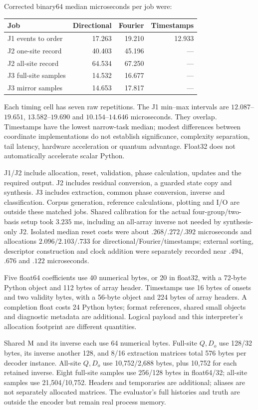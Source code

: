Corrected binary64 median microseconds per job were:
\begin{center}
\begin{tabular}{lrrr}\toprule
Job & Directional & Fourier & Timestamps\\\midrule
J1 events to order &17.263&19.210&12.933\\
J2 one-site record&40.403&45.196&---\\
J2 all-site record&64.534&67.250&---\\
J3 full-site samples&14.532&16.677&---\\
J3 mirror samples&14.653&17.817&---\\\bottomrule
\end{tabular}
\end{center}
Each timing cell has seven raw repetitions. The J1 min--max intervals are $12.087$--$19.651$, $13.582$--$19.690$ and $10.154$--$14.646$ microseconds. They overlap. Timestamps have the lowest narrow-task median; modest differences between coordinate implementations do not establish significance, complexity separation, tail latency, hardware acceleration or quantum advantage. Float32 does not automatically accelerate scalar Python.

J1/J2 include allocation, reset, validation, phase calculation, updates and the required output. J2 includes residual conversion, a guarded state copy and synthesis. J3 includes extraction, common phase conversion, inverse and classification. Corpus generation, reference calculations, plotting and I/O are outside these matched jobs. Shared calibration for the actual four-group/two-basis setup took $3.235$ ms, including an all-array inverse not needed by synthesis-only J2. Isolated median reset costs were about $.268/.272/.392$ microseconds and allocations $2.096/2.103/.733$ for directional/Fourier/timestamps; external sorting, descriptor construction and clock addition were separately recorded near $.494$, $.676$ and $.122$ microseconds.

Five float64 coefficients use 40 numerical bytes, or 20 in float32, with a 72-byte Python object and 112 bytes of array header. Timestamps use 16 bytes of onsets and two validity bytes, with a 56-byte object and 224 bytes of array headers. A completion float costs 24 Python bytes; format references, shared small objects and diagnostic metadata are additional. Logical payload and this interpreter's allocation footprint are different quantities.

Shared $\mathrm M$ and its inverse each use 64 numerical bytes. Full-site $Q,D_o$ use 128/32 bytes, its inverse another 128, and 8/16 extraction matrices total 576 bytes per decoder instance. All-site $Q,D_o$ use 10,752/2,688 bytes, plus 10,752 for each retained inverse. Eight full-site samples use 256/128 bytes in float64/32; all-site samples use 21,504/10,752. Headers and temporaries are additional; aliases are not separately allocated matrices. The evaluator's full histories and truth are outside the encoder but remain real process memory.

